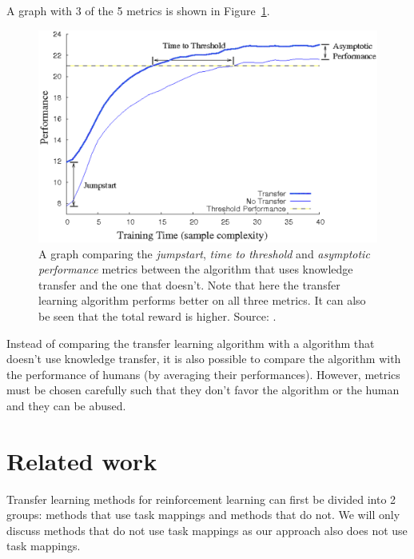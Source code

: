 A graph with 3 of the 5 metrics is shown in Figure~\ref{fig:TLmetrics}.
\begin{figure}[htb]
    \centering
    \includegraphics[width=\linewidth]{images/tlmetrics.png}
    \caption[Transfer learning metrics]{A graph comparing the \textit{jumpstart}, \textit{time to threshold} and \textit{asymptotic performance} metrics between the algorithm that uses knowledge transfer and the one that doesn't. Note that here the transfer learning algorithm performs better on all three metrics. It can also be seen that the total reward is higher. Source: \cite{Taylor2009TransferSurvey}.}
    \label{fig:TLmetrics}
\end{figure}
Instead of comparing the transfer learning algorithm with a algorithm that doesn't use knowledge transfer, it is also possible to compare the algorithm with the performance of humans (by averaging their performances). However, metrics must be chosen carefully such that they don't favor the algorithm or the human and they can be abused.

\section{Related work}




Transfer learning methods for reinforcement learning can first be divided into 2 groups: methods that use task mappings and methods that do not. We will only discuss methods that do not use task mappings as our approach also does not use task mappings.\\

